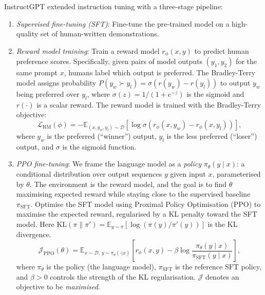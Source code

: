 \begin{deepdive}
InstructGPT \cite{ouyang2022training} extended instruction tuning with a
three-stage pipeline:
\begin{enumerate}
  \item \emph{Supervised fine-tuning (SFT)}: Fine-tune the pre-trained model
        on a high-quality set of human-written demonstrations.
  \item \emph{Reward model training}: Train a reward model $r_\phi(x, y)$
        to predict human preference scores.  Specifically, given pairs of
        model outputs $(y_1, y_2)$ for the same prompt $x$, humans label which
        output is preferred.  The Bradley-Terry model assigns probability $P(y_w \succ y_l) = \sigma(r(y_w) - r(y_l))$ to output $y_w$ being preferred over $y_l$, where $\sigma(z)=1/(1+e^{-z})$ is the sigmoid and $r(\cdot)$ is a scalar reward.  The reward model is trained with the
        Bradley-Terry objective:
        \begin{equation}
          \mathcal{L}_{\mathrm{RM}}(\phi) = -\mathbb{E}_{(x, y_w, y_l) \sim \mathcal{D}}
            \left[\log \sigma\!\left(r_\phi(x, y_w) - r_\phi(x, y_l)\right)\right],
          \label{eq:reward-model}
        \end{equation}
        where $y_w$ is the preferred (``winner'') output, $y_l$ is the less
        preferred (``loser'') output, and $\sigma$ is the sigmoid function.
  \item \emph{PPO fine-tuning}: We frame the language model as a \emph{policy} $\pi_\theta(y \mid x)$: a conditional distribution over output sequences $y$ given input $x$, parameterised by $\theta$. The environment is the reward model, and the goal is to find $\theta$ maximising expected reward while staying close to the supervised baseline $\pi_{\mathrm{SFT}}$.  Optimise the SFT model using Proximal Policy
        Optimisation (PPO) to maximise the expected reward, regularised by a
        KL penalty toward the SFT model.  Here $\mathrm{KL}(\pi \| \pi') = \mathbb{E}_{y \sim \pi}[\log(\pi(y)/\pi'(y))]$ is the KL divergence.
        \begin{equation}
          \mathcal{J}_{\mathrm{PPO}}(\theta) = \mathbb{E}_{x \sim \mathcal{D},\, y \sim \pi_\theta(\cdot|x)}
            \!\left[r_\phi(x, y) - \beta \log \frac{\pi_\theta(y \mid x)}{\pi_{\mathrm{SFT}}(y \mid x)}\right],
          \label{eq:ppo-objective}
        \end{equation}
        where $\pi_\theta$ is the policy (the language model), $\pi_{\mathrm{SFT}}$
        is the reference SFT policy, and $\beta > 0$ controls the strength of
        the KL regularisation.  $\mathcal{J}$ denotes an objective to be
        \emph{maximised}.
\end{enumerate}


\end{deepdive}
